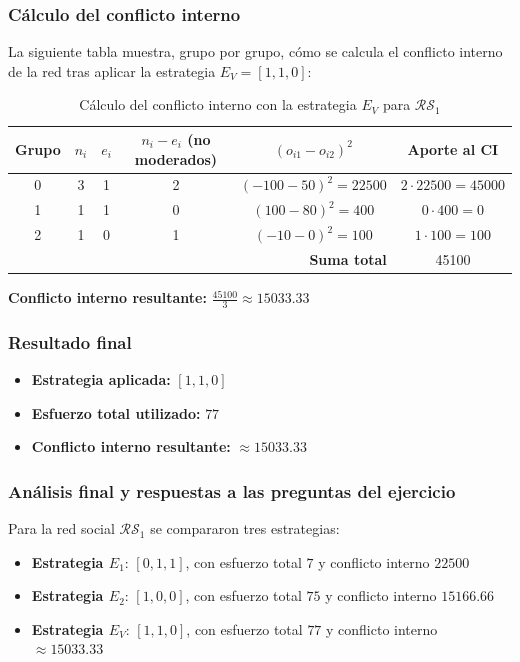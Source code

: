 \documentclass[11pt,letter]{article}
\begin{document}
\subsubsection*{Cálculo del conflicto interno}

La siguiente tabla muestra, grupo por grupo, cómo se calcula el conflicto interno de la red tras aplicar la estrategia $E_V = [1, 1, 0]$:

\begin{table}[H]
\centering
\begin{tabular}{c|c|c|c|c|c}
\textbf{Grupo} & $n_i$ & $e_i$ & $n_i - e_i$ (no moderados) & $(o_{i1} - o_{i2})^2$ & Aporte al CI \\
\hline
0 & 3 & 1 & 2 & $(-100 - 50)^2 = 22500$ & $2 \cdot 22500 = 45000$ \\
1 & 1 & 1 & 0 & $(100 - 80)^2 = 400$ & $0 \cdot 400 = 0$ \\
2 & 1 & 0 & 1 & $(-10 - 0)^2 = 100$ & $1 \cdot 100 = 100$ \\
\hline
\multicolumn{5}{r|}{\textbf{Suma total}} & 45100 \\
\end{tabular}
\caption{Cálculo del conflicto interno con la estrategia $E_V$ para $\mathcal{RS}_1$}
\end{table}

\textbf{Conflicto interno resultante:} $\frac{45100}{3} \approx 15033.33$

\subsubsection*{Resultado final}

\begin{itemize}
    \item \textbf{Estrategia aplicada:} $[1, 1, 0]$
    \item \textbf{Esfuerzo total utilizado:} $77$
    \item \textbf{Conflicto interno resultante:} $\approx 15033.33$
\end{itemize}

\subsubsection*{Análisis final y respuestas a las preguntas del ejercicio}

Para la red social $\mathcal{RS}_1$ se compararon tres estrategias:

\begin{itemize}
    \item \textbf{Estrategia $E_1$}: $[0, 1, 1]$, con esfuerzo total $7$ y conflicto interno $22500$
    \item \textbf{Estrategia $E_2$}: $[1, 0, 0]$, con esfuerzo total $75$ y conflicto interno $15166.66$
    \item \textbf{Estrategia $E_V$}: $[1, 1, 0]$, con esfuerzo total $77$ y conflicto interno $\approx 15033.33$
\end{itemize}
\end{document}
